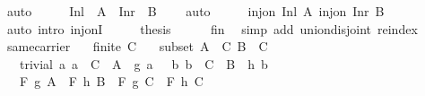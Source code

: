 \begin{isabellebody}
\ auto\isanewline
\ \ \isamarkupfalse%
\ \isamarkupfalse%
\ {\isachardoublequoteopen}Inl\ {\isacharbackquote}{\kern0pt}\ A\ {\isasyminter}\ Inr\ {\isacharbackquote}{\kern0pt}\ B\ {\isacharequal}{\kern0pt}\ {\isacharbraceleft}{\kern0pt}{\isacharbraceright}{\kern0pt}{\isachardoublequoteclose}\ \isamarkupfalse%
\ auto\isanewline
\ \ \isamarkupfalse%
\ \isamarkupfalse%
\ {\isachardoublequoteopen}inj{\isacharunderscore}{\kern0pt}on\ Inl\ A{\isachardoublequoteclose}\ {\isachardoublequoteopen}inj{\isacharunderscore}{\kern0pt}on\ Inr\ B{\isachardoublequoteclose}\ \isamarkupfalse%
\ {\isacharparenleft}{\kern0pt}auto\ intro{\isacharcolon}{\kern0pt}\ inj{\isacharunderscore}{\kern0pt}onI{\isacharparenright}{\kern0pt}\isanewline
\ \ \isamarkupfalse%
\ \isamarkupfalse%
\ {\isacharquery}{\kern0pt}thesis\isanewline
\ \ \ \ \isamarkupfalse%
\ fin\ \isamarkupfalse%
\ {\isacharparenleft}{\kern0pt}simp\ add{\isacharcolon}{\kern0pt}\ union{\isacharunderscore}{\kern0pt}disjoint\ reindex{\isacharparenright}{\kern0pt}\isanewline
{}\isamarkupfalse%
%
\endisatagproof
{\isafoldproof}%
%
\isadelimproof
\isanewline
%
\endisadelimproof
\isanewline
{}\isamarkupfalse%
\ same{\isacharunderscore}{\kern0pt}carrier{\isacharcolon}{\kern0pt}\isanewline
\ \ \ {\isachardoublequoteopen}finite\ C{\isachardoublequoteclose}\isanewline
\ \ \ subset{\isacharcolon}{\kern0pt}\ {\isachardoublequoteopen}A\ {\isasymsubseteq}\ C{\isachardoublequoteclose}\ {\isachardoublequoteopen}B\ {\isasymsubseteq}\ C{\isachardoublequoteclose}\isanewline
\ \ \ trivial{\isacharcolon}{\kern0pt}\ {\isachardoublequoteopen}{\isasymAnd}a{\isachardot}{\kern0pt}\ a\ {\isasymin}\ C\ {\isacharminus}{\kern0pt}\ A\ {\isasymLongrightarrow}\ g\ a\ {\isacharequal}{\kern0pt}\ \ {\isachardoublequoteopen}{\isasymAnd}b{\isachardot}{\kern0pt}\ b\ {\isasymin}\ C\ {\isacharminus}{\kern0pt}\ B\ {\isasymLongrightarrow}\ h\ b\ {\isacharequal}{\kern0pt}\ \isanewline
\ \ \ {\isachardoublequoteopen}F\ g\ A\ {\isacharequal}{\kern0pt}\ F\ h\ B\ {\isasymlongleftrightarrow}\ F\ g\ C\ {\isacharequal}{\kern0pt}\ F\ h\ C{\isachardoublequoteclose}\isanewline
%
\isadelimproof
%
\endisadelimproof
%
\isatagproof
{}\isamarkupfalse%
\ {\isacharminus}{\kern0pt}\isanewline

\end{isabellebody}
